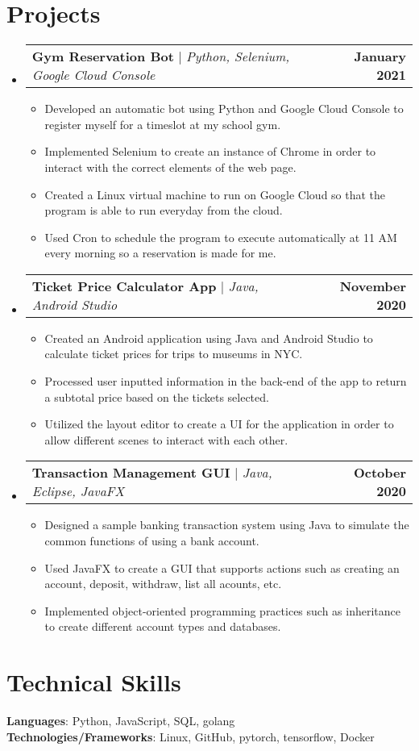 \documentclass[letterpaper,11pt]{article}
\makeatletter
\newcommand{\resumeItem}[1]{
  \item\small{
    {#1 \vspace{-2pt}}
  }
}
\newcommand{\resumeProjectHeading}[2]{
    \item
    \begin{tabular*}{1.001\textwidth}{l@{\extracolsep{\fill}}r}
      \small#1 & \textbf{\small #2}\\
    \end{tabular*}\vspace{-7pt}
}
\newcommand{\resumeSubHeadingListStart}{\begin{itemize}[leftmargin=0.0in, label={}]}
\newcommand{\resumeSubHeadingListEnd}{\end{itemize}}
\newcommand{\resumeItemListStart}{\begin{itemize}}
\newcommand{\resumeItemListEnd}{\end{itemize}\vspace{-5pt}}
\makeatother
\begin{document}
\section{Projects}
    \vspace{-5pt}
    \resumeSubHeadingListStart
      \resumeProjectHeading
          {\textbf{Gym Reservation Bot} $|$ \emph{Python, Selenium, Google Cloud Console}}{January 2021}
          \resumeItemListStart
            \resumeItem{Developed an automatic bot using Python and Google Cloud Console to register myself for a timeslot at my school gym.}
            \resumeItem{Implemented Selenium to create an instance of Chrome in order to interact with the correct elements of the web page.}
            \resumeItem{Created a Linux virtual machine to run on Google Cloud so that the program is able to run everyday from the cloud.}
            \resumeItem{Used Cron to schedule the program to execute automatically at 11 AM every morning so a reservation is made for me.}
          \resumeItemListEnd
          \vspace{-13pt}
      \resumeProjectHeading
          {\textbf{Ticket Price Calculator App} $|$ \emph{Java, Android Studio}}{November 2020}
          \resumeItemListStart
            \resumeItem{Created an Android application using Java and Android Studio to calculate ticket prices for trips to museums in NYC.}
            \resumeItem{Processed user inputted information in the back-end of the app to return a subtotal price based on the tickets selected.}
            \resumeItem{Utilized the layout editor to create a UI for the application in order to allow different scenes to interact with each other.}
          \resumeItemListEnd 
          \vspace{-13pt}
          \resumeProjectHeading
          {\textbf{Transaction Management GUI} $|$ \emph{Java, Eclipse, JavaFX}}{October 2020}
          \resumeItemListStart
            \resumeItem{Designed a sample banking transaction system using Java to simulate the common functions of using a bank account.}
            \resumeItem{Used JavaFX to create a GUI that supports actions such as creating an account, deposit, withdraw, list all acounts, etc.}
            \resumeItem{Implemented object-oriented programming practices such as inheritance to create different account types and databases.}
          \resumeItemListEnd 
    \resumeSubHeadingListEnd
\vspace{-15pt}


%
\section{Technical Skills}
 \begin{itemize}[leftmargin=0.15in, label={}]
    \small{\item{
     \textbf{Languages}{: Python, JavaScript, SQL, golang} \\
     \textbf{Technologies/Frameworks}{: Linux, GitHub, pytorch, tensorflow, Docker} \\
    }}
 \end{itemize}
 \vspace{-16pt}
\end{document}
